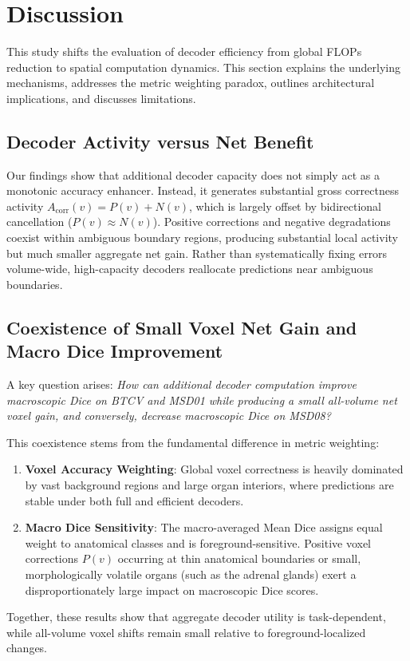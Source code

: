 \section{Discussion}
\label{sec:discussion}

This study shifts the evaluation of decoder efficiency from global FLOPs reduction to spatial computation dynamics. This section explains the underlying mechanisms, addresses the metric weighting paradox, outlines architectural implications, and discusses limitations.

\subsection{Decoder Activity versus Net Benefit}
Our findings show that additional decoder capacity does not simply act as a monotonic accuracy enhancer. Instead, it generates substantial gross correctness activity $A_{\text{corr}}(v) = P(v) + N(v)$, which is largely offset by bidirectional cancellation ($P(v) \approx N(v)$). Positive corrections and negative degradations coexist within ambiguous boundary regions, producing substantial local activity but much smaller aggregate net gain. Rather than systematically fixing errors volume-wide, high-capacity decoders reallocate predictions near ambiguous boundaries.

\subsection{Coexistence of Small Voxel Net Gain and Macro Dice Improvement}
A key question arises: \textit{How can additional decoder computation improve macroscopic Dice on BTCV and MSD01 while producing a small all-volume net voxel gain, and conversely, decrease macroscopic Dice on MSD08?}

This coexistence stems from the fundamental difference in metric weighting:
\begin{enumerate}
    \item \textbf{Voxel Accuracy Weighting}: Global voxel correctness is heavily dominated by vast background regions and large organ interiors, where predictions are stable under both full and efficient decoders.
    \item \textbf{Macro Dice Sensitivity}: The macro-averaged Mean Dice assigns equal weight to anatomical classes and is foreground-sensitive. Positive voxel corrections $P(v)$ occurring at thin anatomical boundaries or small, morphologically volatile organs (such as the adrenal glands) exert a disproportionately large impact on macroscopic Dice scores.
\end{enumerate}
Together, these results show that aggregate decoder utility is task-dependent, while all-volume voxel shifts remain small relative to foreground-localized changes.

